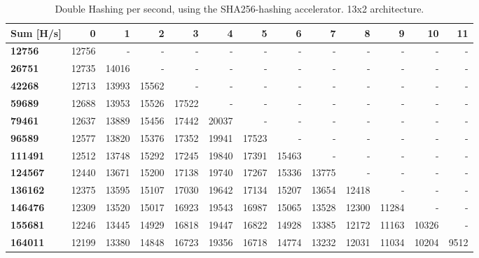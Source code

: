 \begin{appendix}
\begin{table}
\begin{tabular}{| l || r r r r r r r r r r r r |}
  \hline 
  \textbf{Sum} [H/s] & \textbf{0} & \textbf{1} & \textbf{2} & \textbf{3} & \textbf{4} & \textbf{5} & \textbf{6} & \textbf{7} & \textbf{8} & \textbf{9} & \textbf{10} & \textbf{11}\\
  \hline                       
  \textbf{12756} & 12756 & - & - & - & - & - & - & - & - & - & - & - \\
  \textbf{26751} & 12735 & 14016 & - & - & - & - & - & - & - & - & - & - \\
  \textbf{42268} & 12713 & 13993 & 15562 & - & - & - & - & - & - & - & - & - \\
  \textbf{59689} & 12688 & 13953 & 15526 & 17522 & - & - & - & - & - & - & - & - \\
  \textbf{79461} & 12637 & 13889 & 15456 & 17442 & 20037 & - & - & - & - & - & - & - \\
  \textbf{96589} & 12577 & 13820 & 15376 & 17352 & 19941 & 17523 & - & - & - & - & - & - \\
  \textbf{111491} & 12512 & 13748 & 15292 & 17245 & 19840 & 17391 & 15463 & - & - & - & - & - \\
  \textbf{124567} & 12440 & 13671 & 15200 & 17138 & 19740 & 17267 & 15336 & 13775 & - & - & - & -\\
  \textbf{136162} & 12375 & 13595 & 15107 & 17030 & 19642 & 17134 & 15207 & 13654 & 12418 & - & - & -\\
  \textbf{146476} & 12309 & 13520 & 15017 & 16923 & 19543 & 16987 & 15065 & 13528 & 12300 & 11284 & - & -\\
  \textbf{155681} & 12246 & 13445 & 14929 & 16818 & 19447 & 16822 & 14928 & 13385 & 12172 & 11163 & 10326 & -\\
  \textbf{164011} & 12199 & 13380 & 14848 & 16723 & 19356 & 16718 & 14774 & 13232 & 12031 & 11034 & 10204 & 9512\\
  \hline  
\end{tabular}
\caption{Double Hashing per second, using the SHA256-hashing accelerator. 13x2 architecture.}
\label{tab:Perf-SHA2}
\end{table}


\end{appendix}
